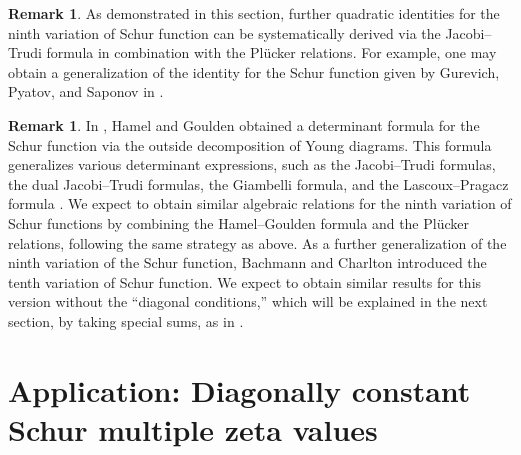 \documentclass[12pt]{amsart}%
\theoremstyle{definition}
\newtheorem{remark}[theorem]{Remark}
\begin{document}
\begin{remark}
As demonstrated in this section, further quadratic identities for the ninth variation of Schur function can be systematically derived via the Jacobi–Trudi formula in combination with the Pl\"{u}cker relations.
For example, one may obtain a generalization of the identity for the Schur function given by Gurevich, Pyatov, and Saponov in \cite[Proposition 3.1]{gps10}.
\end{remark}


\begin{remark}
In \cite{hg}, Hamel and Goulden obtained a determinant formula for the Schur function via the outside decomposition of Young diagrams. This formula generalizes various determinant expressions, such as the Jacobi–Trudi formulas, the dual Jacobi–Trudi formulas, the Giambelli formula, and the Lascoux–Pragacz formula \cite{lp88}.
We expect to obtain similar algebraic relations for the ninth variation of Schur functions by combining the Hamel–Goulden formula and the Pl\"{u}cker relations, following the same strategy as above.
As a further generalization of the ninth variation of the Schur function, Bachmann and Charlton \cite{bc} introduced the tenth variation of Schur function.
We expect to obtain similar results for this version without the “diagonal conditions,” which will be explained in the next section,
by taking special sums, as in \cite{nt}.
\end{remark}


\section{Application: Diagonally constant Schur multiple zeta values}
\label{application}
\end{document}
